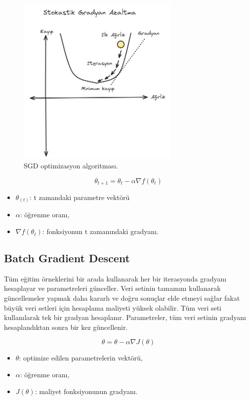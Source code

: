 \begin{figure}[h]
    \centering
    \includegraphics[width=0.7\textwidth]{images/sgd_optimizer.png}
    \caption{SGD optimizasyon algoritması.}
    \label{fig:enter-label}
\end{figure}


\[\theta_{t+1} = \theta_{t} - \alpha \nabla f(\theta_{t})\]
\begin{itemize}
	\item $\theta_(t)$: t zamandaki parametre vektörü
	\item $\alpha$: öğrenme oranı,
	\item $\nabla f(\theta_{t})$: fonksiyonun t zamanındaki gradyanı.
\end{itemize}

\newpage

\subsection{Batch Gradient Descent}

Tüm eğitim örneklerini bir arada kullanarak her bir iterasyonda gradyanı hesaplayar ve parametreleri günceller. Veri setinin tamamını kullanarak güncellemeler yapmak daha kararlı ve doğru sonuçlar elde etmeyi sağlar fakat büyük veri setleri için hesaplama maliyeti yüksek olabilir. Tüm veri seti kullanılarak tek bir gradyan hesaplanır. Parametreler, tüm veri setinin gradyanı hesaplandıktan sonra bir kez güncellenir.

\[\theta = \theta - \alpha \nabla J(\theta)\]

\begin{itemize}
	\item $\theta$: optimize edilen parametrelerin vektörü,
	\item $\alpha$: öğrenme oranı,
	\item $J(\theta)$: maliyet fonksiyonunun gradyanı.
\end{itemize}

